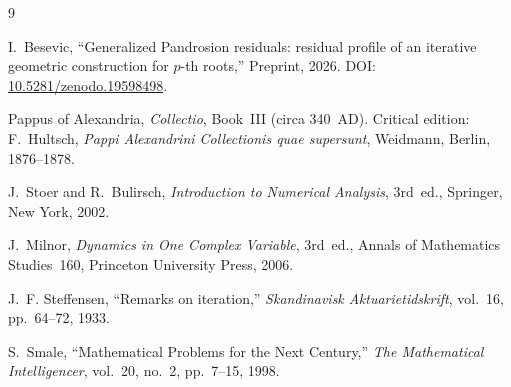 \documentclass[11pt,a4paper]{article}
\theoremstyle{definition}
\begin{document}
\begin{thebibliography}{9}

I.~Besevic,
``Generalized Pandrosion residuals: residual profile of an iterative geometric construction for $p$-th roots,''
Preprint, 2026.
DOI: \href{https://doi.org/10.5281/zenodo.19598498}{10.5281/zenodo.19598498}.

Pappus of Alexandria,
\textit{Collectio}, Book~III (circa 340~AD).
Critical edition: F.~Hultsch, \textit{Pappi Alexandrini Collectionis quae supersunt},
Weidmann, Berlin, 1876--1878.

J.~Stoer and R.~Bulirsch,
\textit{Introduction to Numerical Analysis},
3rd~ed., Springer, New York, 2002.

J.~Milnor,
\textit{Dynamics in One Complex Variable},
3rd~ed., Annals of Mathematics Studies~160, Princeton University Press, 2006.

J.~F. Steffensen,
``Remarks on iteration,''
\textit{Skandinavisk Aktuarietidskrift}, vol.~16, pp.~64--72, 1933.

S.~Smale,
``Mathematical Problems for the Next Century,''
\textit{The Mathematical Intelligencer}, vol.~20, no.~2, pp.~7--15, 1998.

\end{thebibliography}
\end{document}
